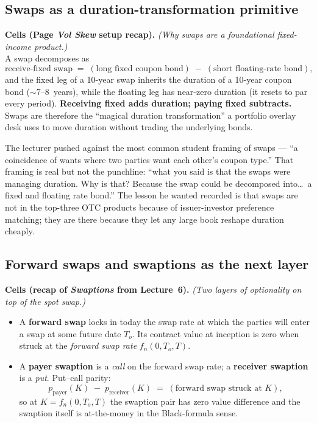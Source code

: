 \subsection{Swaps as a duration-transformation primitive}\label{L7-sec:swaps-recap}

\begin{keyblock}
\textbf{Cells (Page \emph{Vol Skew} setup recap).}
\emph{(Why swaps are a foundational fixed-income product.)}\\
A swap decomposes as
\[
  \text{receive-fixed swap}
     \;=\; (\text{long fixed coupon bond}) \;-\; (\text{short floating-rate bond}),
\]
and the fixed leg of a 10-year swap inherits the duration of a 10-year
coupon bond ($\sim 7$--$8$~years), while the floating leg has near-zero
duration (it resets to par every period). \textbf{Receiving fixed adds
duration; paying fixed subtracts.} Swaps are therefore the
``magical duration transformation'' a portfolio overlay desk uses to
move duration without trading the underlying bonds.
\end{keyblock}

The lecturer pushed against the most common student framing of swaps
--- ``a coincidence of wants where two parties want each other's coupon
type.'' That framing is real but not the punchline:
``what you said is that the swaps were managing duration. Why is that?
Because the swap could be decomposed into\ldots\ a fixed and floating
rate bond.'' The lesson he wanted recorded is that swaps are not in the
top-three OTC products because of issuer-investor preference matching;
they are there because they let any large book reshape duration
cheaply.

\subsection{Forward swaps and swaptions as the next layer}\label{L7-sec:swaptions-recap}

\begin{keyblock}
\textbf{Cells (recap of \emph{Swaptions} from Lecture~6).}
\emph{(Two layers of optionality on top of the spot swap.)}
\begin{itemize}
  \item A \textbf{forward swap} locks in today the swap rate at which
        the parties will enter a swap at some future date $T_o$. Its
        contract value at inception is zero when struck at the
        \emph{forward swap rate} $f_n(0,T_o,T)$.
  \item A \textbf{payer swaption} is a \emph{call} on the forward swap
        rate; a \textbf{receiver swaption} is a \emph{put}.
        Put--call parity:
        \[
          p_{\text{payer}}(K) \;-\; p_{\text{receiver}}(K)
            \;=\; (\text{forward swap struck at } K),
        \]
        so at $K = f_n(0,T_o,T)$ the swaption pair has zero value
        difference and the swaption itself is at-the-money in the
        Black-formula sense.
\end{itemize}
\end{keyblock}

